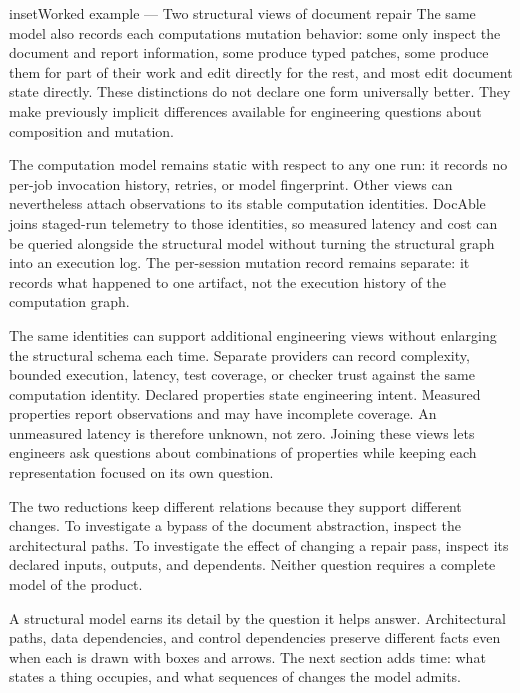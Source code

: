 \begin{bookbox}{inset}{Worked example --- Two structural views of document repair}
The same model also records each computation\textquotesingle s mutation behavior: some only inspect the document and report information, some produce typed patches, some produce them for part of their work and edit directly for the rest, and most edit document state directly. These distinctions do not declare one form universally better. They make previously implicit differences available for engineering questions about composition and mutation.


The computation model remains static with respect to any one run: it records no per-job invocation history, retries, or model fingerprint. Other views can nevertheless attach observations to its stable computation identities. DocAble joins staged-run telemetry to those identities, so measured latency and cost can be queried alongside the structural model without turning the structural graph into an execution log. The per-session mutation record remains separate: it records what happened to one artifact, not the execution history of the computation graph.


The same identities can support additional engineering views without enlarging the structural schema each time. Separate providers can record complexity, bounded execution, latency, test coverage, or checker trust against the same computation identity. Declared properties state engineering intent. Measured properties report observations and may have incomplete coverage. An unmeasured latency is therefore unknown, not zero. Joining these views lets engineers ask questions about combinations of properties while keeping each representation focused on its own question.

The two reductions keep different relations because they support different changes. To investigate a bypass of the document abstraction, inspect the architectural paths. To investigate the effect of changing a repair pass, inspect its declared inputs, outputs, and dependents. Neither question requires a complete model of the product.
\end{bookbox}

A structural model earns its detail by the question it helps answer. Architectural paths, data dependencies, and control dependencies preserve different facts even when each is drawn with boxes and arrows. The next section adds time: what states a thing occupies, and what sequences of changes the model admits.
